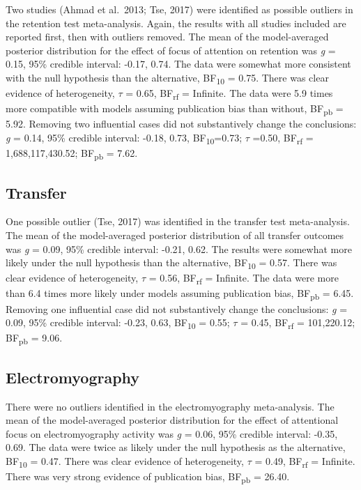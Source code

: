 \documentclass[
  man, donotrepeattitle,floatsintext]{apa7}
\begin{document}
Two studies (Ahmad et al.~2013; Tse, 2017) were identified as possible outliers in the retention test meta-analysis. Again, the results with all studies included are reported first, then with outliers removed. The mean of the model-averaged posterior distribution for the effect of focus of attention on retention was \emph{g} = 0.15, 95\% credible interval: -0.17, 0.74. The data were somewhat more consistent with the null hypothesis than the alternative, BF\textsubscript{10} = 0.75. There was clear evidence of heterogeneity, \(\tau\) = 0.65, BF\textsubscript{rf} = Infinite. The data were 5.9 times more compatible with models assuming publication bias than without, BF\textsubscript{pb} = 5.92. Removing two influential cases did not substantively change the conclusions: \emph{g} = 0.14, 95\% credible interval: -0.18, 0.73, BF\textsubscript{10}=0.73; \(\tau\) =0.50, BF\textsubscript{rf} = 1,688,117,430.52; BF\textsubscript{pb} = 7.62.

\hypertarget{transfer}{%
\subsection{Transfer}\label{transfer}}

One possible outlier (Tse, 2017) was identified in the transfer test meta-analysis. The mean of the model-averaged posterior distribution of all transfer outcomes was \emph{g} = 0.09, 95\% credible interval: -0.21, 0.62. The results were somewhat more likely under the null hypothesis than the alternative, BF\textsubscript{10} = 0.57. There was clear evidence of heterogeneity, \(\tau\) = 0.56, BF\textsubscript{rf} = Infinite. The data were more than 6.4 times more likely under models assuming publication bias, BF\textsubscript{pb} = 6.45. Removing one influential case did not substantively change the conclusions: \emph{g} = 0.09, 95\% credible interval: -0.23, 0.63, BF\textsubscript{10} = 0.55; \(\tau\) = 0.45, BF\textsubscript{rf} = 101,220.12; BF\textsubscript{pb} = 9.06.

\hypertarget{electromyography}{%
\subsection{Electromyography}\label{electromyography}}

There were no outliers identified in the electromyography meta-analysis. The mean of the model-averaged posterior distribution for the effect of attentional focus on electromyography activity was \emph{g} = 0.06, 95\% credible interval: -0.35, 0.69. The data were twice as likely under the null hypothesis as the alternative, BF\textsubscript{10} = 0.47. There was clear evidence of heterogeneity, \(\tau\) = 0.49, BF\textsubscript{rf} = Infinite. There was very strong evidence of publication bias, BF\textsubscript{pb} = 26.40.
\end{document}
